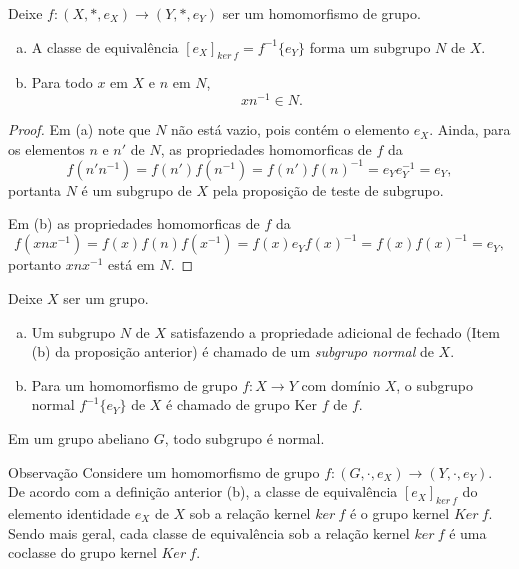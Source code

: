 \begin{stat}
  Deixe $f: (X,*,e_{X}) \to (Y,*,e_{Y})$ ser um homomorfismo de grupo.
  \begin{enumerate}[(a)]
    \item A classe de equivalência $[e_{X}]_{ker\ f}=f^{-1}\{e_{Y}\}$ forma um subgrupo $N$ de $X$.
    \item Para todo $x$ em $X$ e $n$ em $N$, $$xn^{-1} \in N.$$
  \end{enumerate}
  \begin{proof}
    Em (a) note que $N$ não está vazio, pois contém o elemento $e_{X}.$ Ainda, para os elementos $n$ e $n'$ de $N$, as propriedades homomorficas de $f$ da $$f(n'n^{-1})= f(n')f(n^{-1})=f(n')f(n)^{-1}=e_{Y}e_{Y}^{-1}=e_{Y},$$ portanta $N$ é um subgrupo de $X$ pela proposição de teste de subgrupo.

    Em (b) as propriedades homomorficas de $f$ da $$f(xnx^{-1})=f(x)f(n)f(x^{-1})=f(x)e_{Y}f(x)^{-1} = f(x)f(x)^{-1}=e_{Y},$$ portanto $xnx^{-1}$ está em $N$.
  \end{proof}
\end{stat}
\begin{definition}
  Deixe $X$ ser um grupo.
  \begin{enumerate}[(a)]
    \item Um subgrupo $N$ de $X$ satisfazendo a propriedade adicional de fechado (Item (b) da proposição anterior) é chamado de um \emph{subgrupo normal} de $X$.
    \item Para um homomorfismo de grupo $f: X\to Y$ com domínio $X$, o subgrupo normal $f^{-1}\{e_{Y}\}$ de $X$ é chamado de grupo Ker $f$ de $f$.
  \end{enumerate}
\end{definition}

\begin{stat}
  Em um grupo abeliano $G$, todo subgrupo é normal.
\end{stat}

\begin{mymdframed}{Observação}
  Considere um homomorfismo de grupo $f: (G,\cdot,e_{X}) \to (Y,\cdot,e_{Y})$. De acordo com a definição anterior (b), a classe de equivalência $[e_{X}]_{ker\ f}$ do elemento identidade $e_{X}$ de $X$ sob a relação kernel $ker\ f$ é o grupo kernel $Ker\ f$. Sendo mais geral, cada classe de equivalência sob a relação kernel $ker\ f$ é uma coclasse do grupo kernel $Ker\ f$.
\end{mymdframed}

